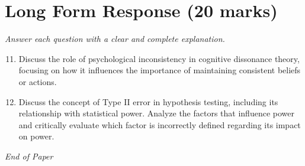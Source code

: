 \documentclass[12pt]{article}
\begin{document}
\section*{Long Form Response (20 marks)}
\textit{Answer each question with a clear and complete explanation.}
\begin{enumerate}[label=\arabic*.]
\setcounter{enumi}{10}
\item Discuss the role of psychological inconsistency in cognitive dissonance theory, focusing
on how it influences the importance of maintaining consistent beliefs or actions.
\item Discuss the concept of Type II error in hypothesis testing, including its relationship
with statistical power. Analyze the factors that influence power and critically evaluate
which factor is incorrectly defined regarding its impact on power.
\end{enumerate}

\vfill
\noindent\textit{End of Paper}
\end{document}
